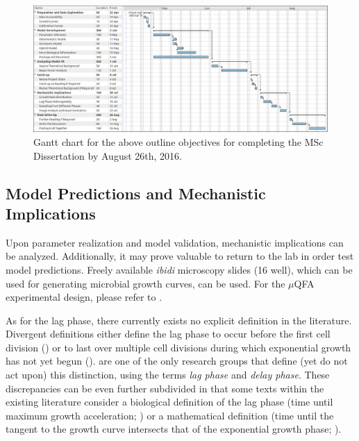 \documentclass{bioinfo}
\begin{document}
\begin{figure}[hb!]
\vspace{-1em}
\centering
\includegraphics[width=1\linewidth]{GanttChart.png}
\caption{Gantt chart for the above outline objectives for completing the MSc Dissertation by August 26th, 2016.}
\label{fig:GanttChart}
\vspace{-0.5em}
\end{figure}

\vspace{-1em}
\subsection{Model Predictions and Mechanistic Implications}

Upon parameter realization and model validation, mechanistic implications can be analyzed. Additionally, it may prove valuable to return to the lab in order test model predictions. Freely available \textit{ibidi} microscopy slides (16 well), which can be used for generating microbial growth curves, can be used. For the $\mu$QFA experimental design, please refer to \citealp{Lawless12}. 

As for the lag phase, there currently exists no explicit definition in the literature. Divergent definitions either define the lag phase to occur before the first cell division (\citealp{Baty04}) or to last over multiple cell divisions during which exponential growth has not yet begun (\citealp{Pin06}). \citealp{Rolfe12} are one of the only research groups that define (yet do not act upon) this distinction, using the terms \textit{lag phase} and \textit{delay phase}. These discrepancies can be even further subdivided in that some texts within the existing literature consider a biological definition of the lag phase (time until maximum growth acceleration; \citealp{Buchanan90}) or a mathematical definition (time until the tangent to the growth curve intersects that of the exponential growth phase; \citealp{Baranyi02}). 
\end{document}
